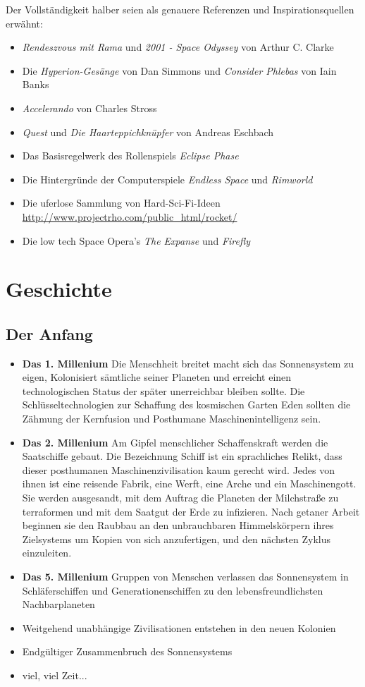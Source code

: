 \documentclass[10pt,a4paper]{report}
\begin{document}
Der Vollständigkeit halber seien als genauere Referenzen und Inspirationsquellen erwähnt:
\begin{itemize}
\item \textit{Rendeszvous mit Rama} und \textit{2001 - Space Odyssey} von Arthur C. Clarke
\item Die \textit{Hyperion-Gesänge} von Dan Simmons und \textit{Consider Phlebas} von Iain Banks
\item \textit{Accelerando} von Charles Stross
\item \textit{Quest} und \textit{Die Haarteppichknüpfer} von Andreas Eschbach
\item Das Basisregelwerk des Rollenspiels \textit{Eclipse Phase}
\item Die Hintergründe der Computerspiele \textit{Endless Space} und \textit{Rimworld}
\item Die uferlose Sammlung von Hard-Sci-Fi-Ideen \url{http://www.projectrho.com/public_html/rocket/}
\item Die low tech Space Opera's \textit{The Expanse} und \textit{Firefly}
\end{itemize}

\chapter{Geschichte}
\section*{Der Anfang}
\begin{itemize}
\item \textbf{Das 1. Millenium} Die Menschheit breitet macht sich das Sonnensystem zu eigen, Kolonisiert sämtliche seiner Planeten und erreicht einen technologischen Status der später unerreichbar bleiben sollte. Die Schlüsseltechnologien zur Schaffung des kosmischen Garten Eden sollten die Zähmung der Kernfusion und Posthumane Maschinenintelligenz sein.
\item \textbf{Das 2. Millenium} Am Gipfel menschlicher Schaffenskraft werden die Saatschiffe gebaut. Die Bezeichnung Schiff ist ein sprachliches Relikt, dass dieser posthumanen Maschinenzivilisation kaum gerecht wird. Jedes von ihnen ist eine reisende Fabrik, eine Werft, eine Arche und ein Maschinengott. Sie werden ausgesandt, mit dem Auftrag die Planeten der Milchstraße zu terraformen und mit dem Saatgut der Erde zu infizieren. Nach getaner Arbeit beginnen sie den Raubbau an den unbrauchbaren Himmelskörpern ihres Zielsystems um Kopien von sich anzufertigen, und den nächsten Zyklus einzuleiten.
\item \textbf{Das 5. Millenium} Gruppen von Menschen verlassen das Sonnensystem in Schläferschiffen und Generationenschiffen zu den lebensfreundlichsten Nachbarplaneten
\item Weitgehend unabhängige Zivilisationen entstehen in den neuen Kolonien
\item Endgültiger Zusammenbruch des Sonnensystems
\item viel, viel Zeit...
\end{itemize}
\end{document}
